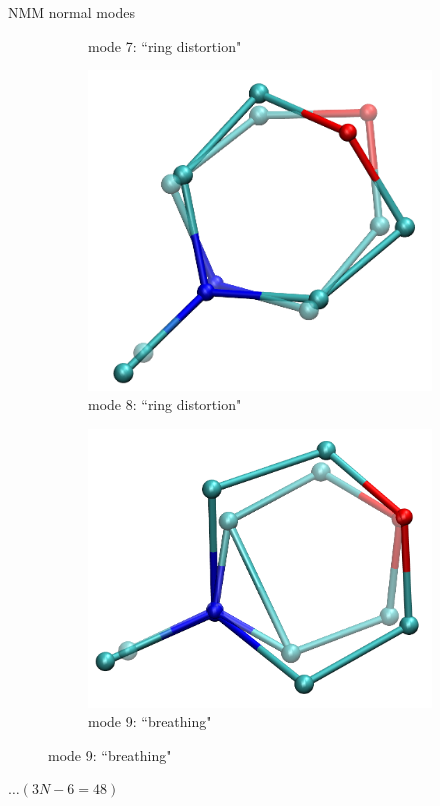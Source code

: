 \documentclass{beamer}
\begin{document}
\begin{frame}{NMM normal modes}
\begin{figure}
\begin{subfigure}{\x\textwidth}
			\caption{mode 7: ``ring distortion"}
		\end{subfigure}
		\begin{subfigure}{\x\textwidth}
		\includegraphics[width=\textwidth]{mode8_ot.png}
		\caption{mode 8: ``ring distortion"}
		\end{subfigure}
		\begin{subfigure}{\x\textwidth}
			\includegraphics[width=\textwidth]{mode9_ot.png}
			\caption{mode 9: ``breathing"}
		\end{subfigure}
	\end{figure}
$\dots (3N - 6 = 48)$
\end{frame}
\end{document}
